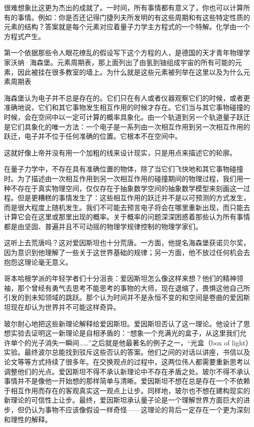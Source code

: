   很难想象比这更为杰出的成就了。一时间，所有事情都有意义了，你也可以计算所有的事情。例如：你是否还记得门捷列夫所发明的有这些周期和有这些特定性质的元素的结构？答案就是每个元素对应着量子力学主方程式的一个特解。化学由一个方程式产生。

  第一个依据那些令人眼花缭乱的假设写下这个方程的人，是德国的天才青年物理学家沃纳·海森堡。元素周期表，那上面列出了由氢到铀组成宇宙的所有可能的元素，因此被挂在很多教室的墙上。为什么就是这些元素被列举在这里以及为什么元素周期表

  海森堡认为电子并不总是存在的。它们只在有人或者仪器观察它们的时候，或者更准确地说，它们和其它事物发生相互作用的时候才存在。它们当与其它事物碰撞的时候，会在空间中以一定可计算的概率具象化。由一个轨道到另一个轨道量子跃迁是它们具象化的唯一方法：一个电子是一系列由一次相互作用到另一次相互作用的跃迁，电子并不位于任何准确的位置。它根本不在空间中。

  这就好像上帝并没有用一个加粗的线来设计现实，只是用点来描述它的轮廓。

  在量子力学中，不存在具有准确位置的物体，除了当它们飞快地和其它事物碰撞时。为了描述由一次相互作用到另一次相互作用的碰撞期间的物理过程，我们用一种不存在于真实物理空间，仅仅存在于抽象数学空间的抽象数学模型来刻画这一过程。但是更糟糕的事情发生了：这些相互作用的跃迁并不是以可预测的方式发生，而是很大程度上随机发生。我们不可能去预言电子将会在哪里重新出现，而只能去计算它会在这里或那里出现的概率。关于概率的问题深深困惑着那些认为所有事情都是由坚固、普遍并且不可动摇的物理学规律控制的物理学家们。   

   这听上去荒唐吗？这对爱因斯坦也十分荒唐。一方面，他提名海森堡获诺贝尔奖，因为意识到他理解了一些关于这世界基础的规律；另一方面，他不放过任何机会去抱怨这理论毫无意义。

   哥本哈根学派的年轻学者们十分沮丧：爱因斯坦怎么像这样来想？他们的精神领袖，那个曾经有勇气去思考不能思考的事物的大师，现在退缩了，畏惧这他自己所引发的到未知领域的跳跃。那个认为时间并不是永恒不变的和空间是卷曲的爱因斯坦现在却认为世界并不可能这样奇异。

  玻尔耐心地把这些新理论解释给爱因斯坦。爱因斯坦否认了这一理论。他设计了思想实验去证明这一新理论是自相矛盾的：“想象一个充满光的盒子，从这里我们允许单个的光子消失一瞬间……”之后就是他最著名的例子之一，“光盒（box of light）实验。最终波尔总能找到驳斥这些否认的答案。他们之间的对话以讲座，书信以及论文等等方式持续了很多年。在交换观点的过程中，这两位伟人都需要重新思考以调整他们的光点。爱因斯坦不得不承认新理论中不存在矛盾之处。玻尔不得不承认事情并不是像他一开始想的那样简单与清晰。爱因斯坦不想在总是存在一个不依赖于相互作用而存在的客观真实这一观点上让步。同样地，玻尔也不想在建构现实的新理论的可信性上让步。最终，爱因斯坦承认量子论是一个理解世界方面巨大的进步，但仍认为事物不应该像假设一样奇怪——这理论的背后一定存在一个更为深刻和理性的解释。

